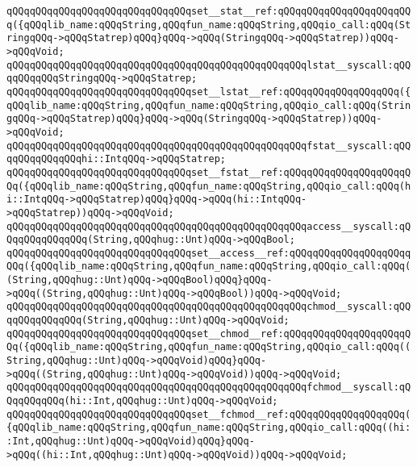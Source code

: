 \verb|qQQqqQQqqQQqqQQqqQQqqQQqqQQqqQQqset__stat__ref:qQQqqQQqqQQqqQQqqQQqqQQq({qQQqlib_name:qQQqString,qQQqfun_name:qQQqString,qQQqio_call:qQQq(StringqQQq->qQQqStatrep)qQQq}qQQq->qQQq(StringqQQq->qQQqStatrep))qQQq->qQQqVoid;|\newline
\newline
\verb|qQQqqQQqqQQqqQQqqQQqqQQqqQQqqQQqqQQqqQQqqQQqqQQqqQQqlstat__syscall:qQQqqQQqqQQqStringqQQq->qQQqStatrep;|\newline
\verb|qQQqqQQqqQQqqQQqqQQqqQQqqQQqqQQqset__lstat__ref:qQQqqQQqqQQqqQQqqQQq({qQQqlib_name:qQQqString,qQQqfun_name:qQQqString,qQQqio_call:qQQq(StringqQQq->qQQqStatrep)qQQq}qQQq->qQQq(StringqQQq->qQQqStatrep))qQQq->qQQqVoid;|\newline
\newline
\verb|qQQqqQQqqQQqqQQqqQQqqQQqqQQqqQQqqQQqqQQqqQQqqQQqqQQqfstat__syscall:qQQqqQQqqQQqqQQqhi::IntqQQq->qQQqStatrep;|\newline
\verb|qQQqqQQqqQQqqQQqqQQqqQQqqQQqqQQqset__fstat__ref:qQQqqQQqqQQqqQQqqQQqqQQq({qQQqlib_name:qQQqString,qQQqfun_name:qQQqString,qQQqio_call:qQQq(hi::IntqQQq->qQQqStatrep)qQQq}qQQq->qQQq(hi::IntqQQq->qQQqStatrep))qQQq->qQQqVoid;|\newline
\newline
\verb|qQQqqQQqqQQqqQQqqQQqqQQqqQQqqQQqqQQqqQQqqQQqqQQqqQQqaccess__syscall:qQQqqQQqqQQqqQQq(String,qQQqhug::Unt)qQQq->qQQqBool;|\newline
\verb|qQQqqQQqqQQqqQQqqQQqqQQqqQQqqQQqset__access__ref:qQQqqQQqqQQqqQQqqQQqqQQq({qQQqlib_name:qQQqString,qQQqfun_name:qQQqString,qQQqio_call:qQQq((String,qQQqhug::Unt)qQQq->qQQqBool)qQQq}qQQq->qQQq((String,qQQqhug::Unt)qQQq->qQQqBool))qQQq->qQQqVoid;|\newline
\newline
\verb|qQQqqQQqqQQqqQQqqQQqqQQqqQQqqQQqqQQqqQQqqQQqqQQqqQQqchmod__syscall:qQQqqQQqqQQqqQQq(String,qQQqhug::Unt)qQQq->qQQqVoid;|\newline
\verb|qQQqqQQqqQQqqQQqqQQqqQQqqQQqqQQqset__chmod__ref:qQQqqQQqqQQqqQQqqQQqqQQq({qQQqlib_name:qQQqString,qQQqfun_name:qQQqString,qQQqio_call:qQQq((String,qQQqhug::Unt)qQQq->qQQqVoid)qQQq}qQQq->qQQq((String,qQQqhug::Unt)qQQq->qQQqVoid))qQQq->qQQqVoid;|\newline
\newline
\verb|qQQqqQQqqQQqqQQqqQQqqQQqqQQqqQQqqQQqqQQqqQQqqQQqqQQqfchmod__syscall:qQQqqQQqqQQq(hi::Int,qQQqhug::Unt)qQQq->qQQqVoid;|\newline
\verb|qQQqqQQqqQQqqQQqqQQqqQQqqQQqqQQqset__fchmod__ref:qQQqqQQqqQQqqQQqqQQq({qQQqlib_name:qQQqString,qQQqfun_name:qQQqString,qQQqio_call:qQQq((hi::Int,qQQqhug::Unt)qQQq->qQQqVoid)qQQq}qQQq->qQQq((hi::Int,qQQqhug::Unt)qQQq->qQQqVoid))qQQq->qQQqVoid;|\newline
